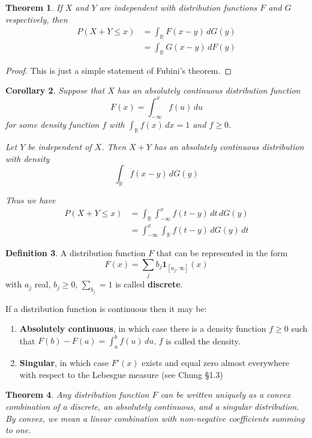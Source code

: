 \documentclass[10pt, oneside, reqno]{amsart}
\theoremstyle{plain}%
\newtheorem{thm}{Theorem}[section]
\newtheorem{cor}[thm]{Corollary}
\theoremstyle{definition}
\newtheorem{defn}[thm]{Definition}
\theoremstyle{remark}
\newcommand{\R}{\mathbb{R}}
\begin{document}
\begin{thm}
    If $X$ and $Y$ are independent with distribution functions $F$ and $G$ respectively, then 
    \begin{align*}
        P(X+Y \leq x) &= \int_\R F(x-y) \, dG(y) \\
                      &= \int_\R G(x-y) \, dF(y)
    \end{align*}
\end{thm}
\begin{proof}
    This is just a simple statement of Fubini's theorem.
\end{proof}

\begin{cor}
    Suppose that $X$ has an absolutely continuous distribution function \[
        F(x) = \int_{-\infty}^x f(u) \, du
    \] for some density function $f$ with $\int_\R f(x) \, dx = 1$ and $f \geq 0$.  
    
    Let $Y$ be independent of $X$.  Then $X+Y$ has an absolutely continuous distribution with density \[
        \int_\R f(x-y) \, dG(y)
    \]
    
    Thus we have
    \begin{align*}
        P(X+Y \leq x)   &= \int_\R \int_{-\infty}^x f(t-y) \, dt \, dG(y) \\
                        &= \int_{-\infty}^x \int_\R f(t-y) \, dG(y) \, dt
    \end{align*}
\end{cor}

\begin{defn}
    A distribution function $F$ that can be represented in the form \[
        F(x) = \sum_j b_j \mathbf{1}_{[a_j, \infty]}(x)
    \] with $a_j$ real, $b_j \geq 0$, $\sum_{b_j} = 1$ is called \textbf{discrete}.
    
\end{defn}

If a distribution function is continuous then it may be:
\begin{enumerate}
    \item \textbf{Absolutely continuous}, in which case there is a density function $f \geq 0$ such that $F(b) - F(a) = \int_a^b f(u)\, du$.  $f$ is called the density.
    \item \textbf{Singular}, in which case $F'(x)$ exists and equal zero almost everywhere with respect to the Lebesgue measure (see Chung \S1.3)
\end{enumerate}

\begin{thm}
    Any distribution function $F$ can be written uniquely as a convex combination of a discrete, an absolutely continuous, and a singular distribution.  By convex, we mean a linear combination with non-negative coefficients summing to one.   
\end{thm}
\end{document}
